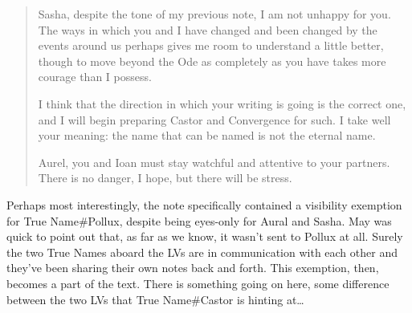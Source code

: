 \begin{quote}
Sasha, despite the tone of my previous note, I am not unhappy for you. The ways in which you and I have changed and been changed by the events around us perhaps gives me room to understand a little better, though to move beyond the Ode as completely as you have takes more courage than I possess.

I think that the direction in which your writing is going is the correct one, and I will begin preparing Castor and Convergence for such. I take well your meaning: the name that can be named is not the eternal name.

Aurel, you and Ioan must stay watchful and attentive to your partners. There is no danger, I hope, but there will be stress.
\end{quote}

Perhaps most interestingly, the note specifically contained a visibility exemption for True Name\#Pollux, despite being eyes-only for Aural and Sasha. May was quick to point out that, as far as we know, it wasn't sent to Pollux at all. Surely the two True Names aboard the LVs are in communication with each other and they've been sharing their own notes back and forth. This exemption, then, becomes a part of the text. There is something going on here, some difference between the two LVs that True Name\#Castor is hinting at\ldots{}
